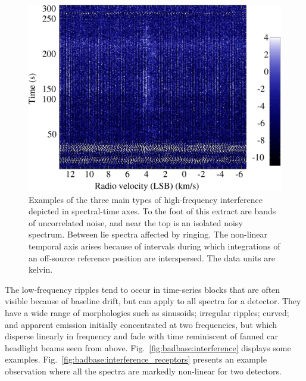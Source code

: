 \documentclass[a4paper,fleqn,usenatbib]{mnras}
\begin{document}
\begin{figure}
\includegraphics[width=\columnwidth]{high_freq_three_types}
\caption{Examples of the three main types of high-frequency
  interference depicted in spectral-time axes.  To the foot of this extract
  are bands of uncorrelated noise, and near the top is an isolated
  noisy spectrum.  Between lie spectra affected by ringing.
  The non-linear temporal axis arises because of intervals during
  which integrations of an off-source reference position are
  interspersed. The data units are kelvin.}
\label{fig:badbase:highfreq}
\end{figure}

The low-frequency ripples tend to occur in time-series blocks that are
often visible because of baseline drift, but can apply to all spectra
for a detector.  They have a wide range of morphologies such as
sinusoids; irregular ripples; curved; and apparent emission initially
concentrated at two frequencies, but which disperse linearly in
frequency and fade with time reminiscent of fanned car headlight
beams seen from above.
Fig.~\ref{fig:badbase:interference} displays some examples.
Fig.~\ref{fig:badbase:interference_receptors} presents an example
observation where all the spectra are markedly non-linear for two
detectors.
\end{document}
